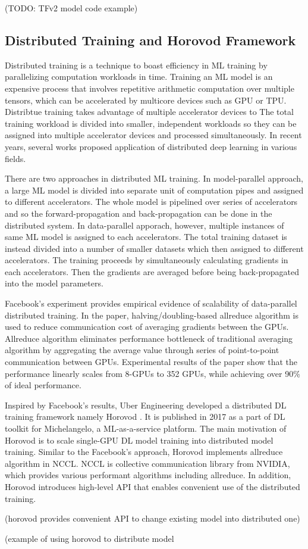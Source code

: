 (TODO: TFv2 model code example)

\subsection{Distributed Training and Horovod Framework}

Distributed training is a technique to boast efficiency in ML training
by parallelizing computation workloads in time.
Training an ML model is an expensive process that involves repetitive
arithmetic computation over multiple tensors,
which can be accelerated by multicore devices such as GPU or TPU. 
Distribtue training takes advantage of multiple accelerator devices to
The total training workload is divided into smaller, independent workloads
so they can be assigned into multiple accelerator devices and
processed simultaneously. 
In recent years, several works proposed application of distributed
deep learning in various fields.

There are two approaches in distributed ML training.
In model-parallel approach, a large ML model is divided into separate unit
of computation pipes and assigned to different accelerators. The whole model
is pipelined over series of accelerators and so the forward-propagation and
back-propagation can be done in the distributed system.
In data-parallel apporach, however, multiple instances of same ML model
is assigned to each accelerators. The total training dataset is instead
divided into a number of smaller datasets which then assigned to different
accelerators. The training proceeds by simultaneously calculating gradients
in each accelerators. Then the gradients are averaged before being 
back-propagated into the model parameters.

Facebook's experiment \cite{facebook2018} provides empirical evidence of
scalability of data-parallel distributed training. In the paper, 
halving/doubling-based allreduce algorithm is used to reduce communication cost 
of averaging gradients between the GPUs. 
Allreduce algorithm eliminates performance bottleneck of traditional
averaging algorithm by aggregating the average value through series of
point-to-point communication between GPUs. 
Experimental results of the paper show that the performance linearly
scales from 8-GPUs to 352 GPUs, while achieving over 90\% of ideal performance.

Inspired by Facebook's results, Uber Engineering developed a distributed DL
training framework namely Horovod \cite{sergeev2018horovod}. It is published in
2017 as a part of DL toolkit for Michelangelo, a ML-as-a-service platform.
The main motivation of Horovod is to scale single-GPU DL model training
into distributed model training. Similar to the Facebook's approach,
Horovod implements allreduce algorithm in NCCL. NCCL is collective communication
library from NVIDIA, which provides various performant algorithms including
allreduce. In addition, Horovod introduces high-level API that enables
convenient use of the distributed training.  

(horovod provides convenient API to change existing model into distributed one)

(example of using horovod to distribute model
